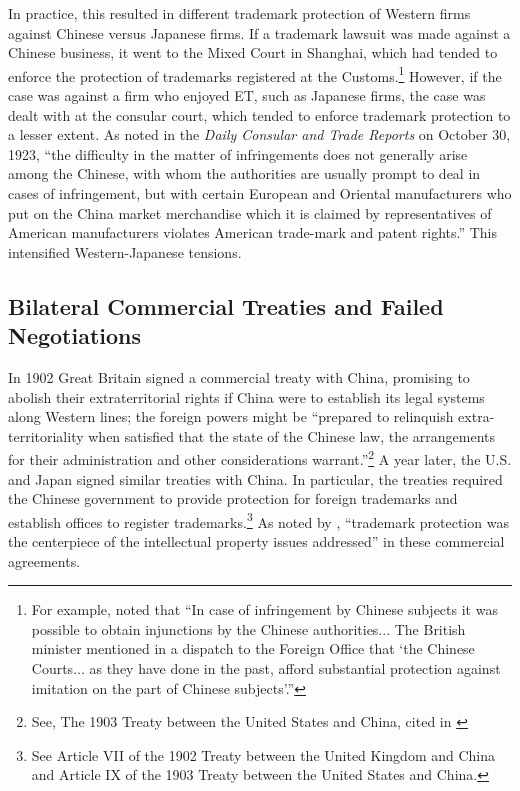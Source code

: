 \documentclass[12pt]{article}
\begin{document}
In practice, this resulted in different trademark protection of Western firms against Chinese versus Japanese firms. If a trademark lawsuit was made against a Chinese business, it went to the Mixed Court in Shanghai, which had tended to enforce the protection of trademarks registered at the Customs.\footnote{For example, \cite{Heuser1975} noted that ``In case of infringement by Chinese subjects it was possible to obtain injunctions by the Chinese authorities... The British minister mentioned in a dispatch to the Foreign Office that `the Chinese Courts... as they have done in the past, afford substantial protection against imitation on the part of Chinese subjects'.''} However, if the case was against a firm who enjoyed ET, such as Japanese firms, the case was dealt with at the consular court, which tended to enforce trademark protection to a lesser extent. As noted in the \emph{Daily Consular and Trade Reports} on October 30, 1923, ``the difficulty in the matter of infringements does not generally arise among the Chinese, with whom the authorities are usually prompt to deal in cases of infringement, but with certain European and Oriental manufacturers who put on the China market merchandise which it is claimed by representatives of American manufacturers violates American trade-mark and patent rights.'' This intensified Western-Japanese tensions. 

\subsection{Bilateral Commercial Treaties and Failed Negotiations}

In 1902 Great Britain signed a commercial treaty with China, promising to abolish their extraterritorial rights if China were to establish its legal systems along Western lines; the foreign powers might be ``prepared to relinquish extra-territoriality when satisfied that the state of the Chinese law, the arrangements for their administration and other considerations warrant.''\footnote{See, The 1903 Treaty between the United States and China, cited in \citet[p. 36]{Alford1995}} A year later, the U.S. and Japan signed similar treaties with China. In particular, the treaties required the Chinese government to provide protection for foreign trademarks and establish offices to register trademarks.\footnote{See Article VII of the 1902 Treaty between the United Kingdom and China and Article IX of the 1903 Treaty between the United States and China.} As noted by \cite{Alford1995}, ``trademark protection was the centerpiece of the intellectual property issues addressed'' in these commercial agreements.
\end{document}
